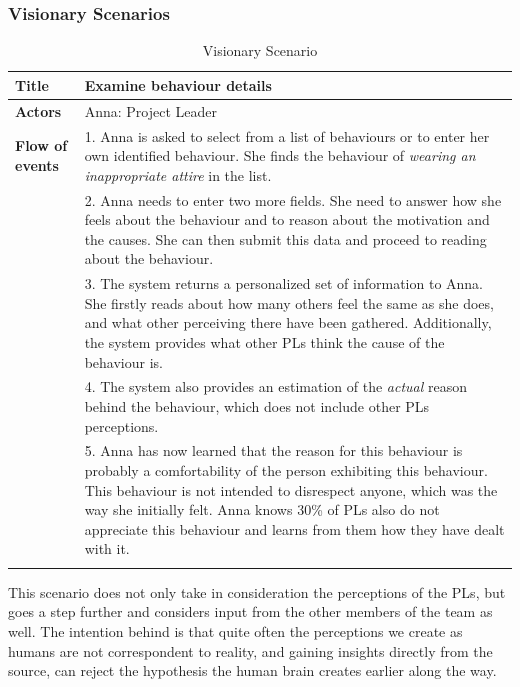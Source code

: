\subsubsection{Visionary Scenarios}


\begin{longtable}[ht]{ p{}  p{} }
\caption{Visionary Scenario}
\label{tab:hiding}\\
\hline
\textbf{Title} & Examine behaviour details \\
    \hline
   \textbf{Actors} & Anna: Project Leader \\
   \hline
   \textbf{Flow of events } &  1. Anna is asked to select from a list of behaviours or to enter her own identified behaviour. She finds the behaviour of \textit{wearing an inappropriate attire} in the list. \\
   & 2. Anna needs to enter two more fields. She need to answer how she feels about the behaviour and to reason about the motivation and the causes. She can then submit this data and proceed to reading about the behaviour. \\
   & 3. The system returns a personalized set of information to Anna. She firstly reads about how many others feel the same as she does, and what other perceiving there have been gathered. Additionally, the system provides what other PLs think the cause of the behaviour is. \\
   & 4. The system also provides an estimation of the \textit{actual} reason behind the behaviour, which does not include other PLs perceptions. \\
   & 5. Anna has now learned that the reason for this behaviour is probably a comfortability of the person exhibiting this behaviour. This behaviour is not intended to disrespect anyone, which was the way she initially felt. Anna knows 30\% of PLs also do not appreciate this behaviour and learns from them how they have dealt with it. \\
   \hline
\label{tab:multicol}
\end{longtable}

This scenario does not only take in consideration the perceptions of the PLs, but goes a step further and considers input from the other members of the team as well. The intention behind is that quite often the perceptions we create as humans are not correspondent to reality, and gaining insights directly from the source, can reject the hypothesis the human brain creates earlier along the way.

